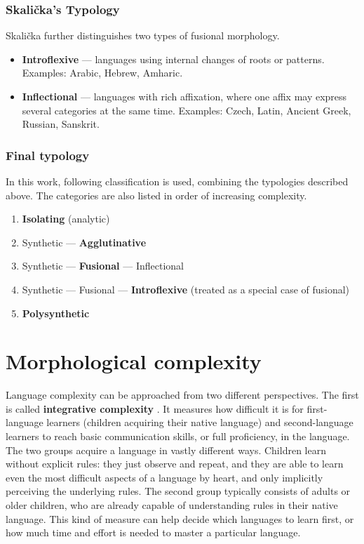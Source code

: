 \subsubsection{Skalička's Typology}

Skalička further distinguishes two types of fusional morphology.

\begin{itemize}
    \item \textbf{Introflexive} --- languages using internal changes of roots or patterns. Examples: Arabic, Hebrew, Amharic.
    
    \item \textbf{Inflectional} --- languages with rich affixation, where one affix may express several categories at the same time. Examples: Czech, Latin, Ancient Greek, Russian, Sanskrit.
\end{itemize}

\subsubsection{Final typology}

In this work, following classification is used, combining the typologies described above. The categories are also listed in order of increasing complexity.
\begin{enumerate}
    \item \textbf{Isolating} (analytic)
    \item Synthetic --- \textbf{Agglutinative}
    \item Synthetic --- \textbf{Fusional} --- Inflectional
    \item Synthetic --- Fusional --- \textbf{Introflexive} (treated as a special case of fusional)
    \item \textbf{Polysynthetic}
\end{enumerate}



\newpage{}
\section{Morphological complexity}

Language complexity can be approached from two different perspectives. The first is called \textbf{integrative complexity} \parencite{Coltekin2022}. It measures how difficult it is for first-language learners (children acquiring their native language) and second-language learners to reach basic communication skills, or full proficiency, in the language. The two groups acquire a language in vastly different ways. Children learn without explicit rules: they just observe and repeat, and they are able to learn even the most difficult aspects of a language by heart, and only implicitly perceiving the underlying rules. The second group typically consists of adults or older children, who are already capable of understanding rules in their native language. This kind of measure can help decide which languages to learn first, or how much time and effort is needed to master a particular language.


